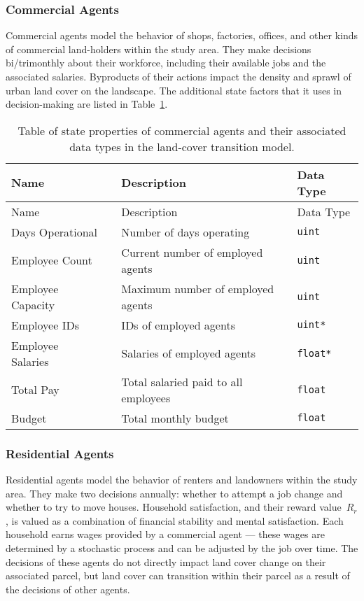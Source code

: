 \subsubsection*{Commercial Agents}

Commercial agents model the behavior of shops, factories, offices, 
and other kinds of commercial land-holders within the study area. 
They make decisions bi/trimonthly about their workforce, 
including their available jobs and the associated salaries.
Byproducts of their actions impact the density and sprawl of urban
land cover on the landscape.
The additional state factors that it uses in decision-making are listed
in Table~\ref{tab:land_state_com}.

\begin{longtable}{lcp{.45\linewidth}l}
\caption{Table of state properties of commercial agents and their
associated data types in the land-cover transition model.}
\label{tab:land_state_com} \\
\hline \hline
Name & & Description & Data Type \\ \hline
\endfirsthead
\hline \hline
Name & & Description & Data Type \\ \hline
\endhead
\hline\endfoot
Days Operational && Number of days operating & \tt{uint}\\
Employee Count && Current number of employed agents & \tt{uint}\\
Employee Capacity && Maximum number of employed agents & \tt{uint}\\
Employee IDs && IDs of employed agents & \tt{uint*}\\
Employee Salaries && Salaries of employed agents & \tt{float*}\\
Total Pay && Total salaried paid to all employees & \tt{float} \\
Budget && Total monthly budget & \tt{float} \\
\end{longtable}

\subsubsection*{Residential Agents}

Residential agents model the behavior of renters and landowners within 
the study area. 
They make two decisions annually: whether to attempt a job change 
and whether to try to move houses. 
Household satisfaction, and their reward value~$R_r$,
is valued as a combination of financial stability 
and mental satisfaction. 
Each household earns wages provided by a commercial agent --- 
these wages are determined by a stochastic process and can be adjusted by 
the job over time.
The decisions of these agents do not directly impact land cover change
on their associated parcel, but land cover can transition within their
parcel as a result of the decisions of other agents.

